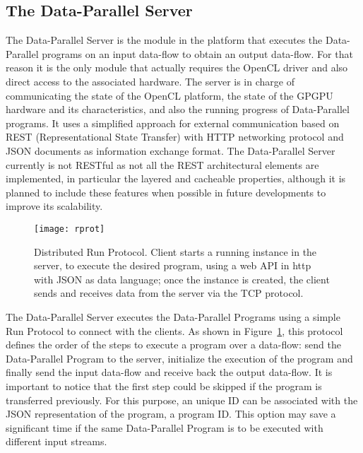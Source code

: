 \documentclass[conference]{IEEEtran}
\newcommand{\is}{250pt} \newcommand{\iss}{250pt}
\begin{document}
\subsection{The Data-Parallel Server}



The Data-Parallel Server is the module in the platform that executes the
Data-Parallel programs on an input data-flow to obtain an output data-flow.  For
that reason it is the only module that actually requires the OpenCL driver and
also direct access to the associated hardware.  The server is in charge of
communicating the state of the OpenCL platform, the state of the GPGPU hardware
and its characteristics, and also the running progress of Data-Parallel
programs.  It uses a simplified approach for external communication based on
REST (Representational State Transfer)\cite{Fielding:2002:PDM:514183.514185}
with HTTP networking protocol and JSON documents as information exchange format.
The Data-Parallel Server currently is not RESTful as not all the REST
architectural elements are implemented, in particular the layered and cacheable
properties, although it is planned to include these features when possible in
future developments to improve its scalability.

\begin{figure}[t]
\begin{center}
\texttt{[image: rprot]}
\end{center}
\caption{Distributed Run Protocol. Client starts a running instance in the
  server, to execute the desired program, using a web API in http with JSON as
  data language; once the instance is created, the client sends and receives
  data from the server via the TCP protocol.}
\label{fig:runprotocol01}
\end{figure}

The Data-Parallel Server executes the Data-Parallel Programs using a simple Run
Protocol to connect with the clients.  As shown in
Figure~\ref{fig:runprotocol01}, this protocol defines the order of the steps to
execute a program over a data-flow: send the Data-Parallel Program to the
server, initialize the execution of the program and finally send the input
data-flow and receive back the output data-flow.  It is important to notice that
the first step could be skipped if the program is transferred previously.  For
this purpose, an unique ID can be associated with the JSON representation of the
program, a program ID.  This option may save a significant time if the same
Data-Parallel Program is to be executed with different input streams.
\end{document}
